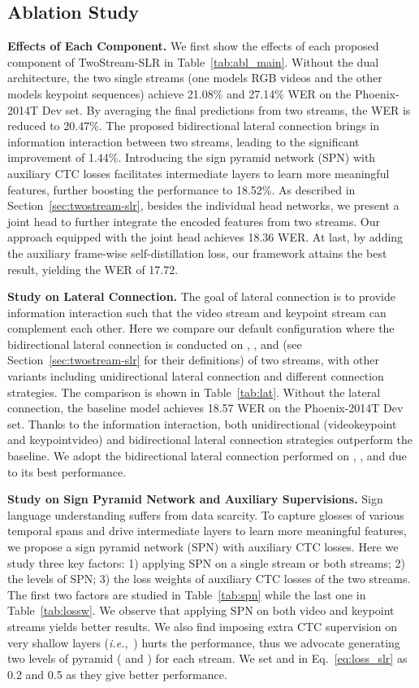 \documentclass{article}
\def\ie{\emph{i.e.}} \def\Ie{\emph{I.e.}}
\begin{document}
\subsection{Ablation Study}
\label{sec:ablation}
\textbf{Effects of Each Component.} We first show the effects of each proposed component of TwoStream-SLR in Table~\ref{tab:abl_main}. Without the dual architecture, the two single streams (one models RGB videos and the other models keypoint sequences) achieve 21.08\% and 27.14\% WER on the Phoenix-2014T Dev set. By averaging the final predictions from two streams, the WER is reduced to 20.47\%. The proposed bidirectional lateral connection brings in information interaction between two streams, leading to the significant improvement of 1.44\%. Introducing the sign pyramid network (SPN) with auxiliary CTC losses facilitates intermediate layers to learn more meaningful features, further boosting the performance to 18.52\%. As described in Section~\ref{sec:twostream-slr}, besides the individual head networks, we present a joint head to further integrate the encoded features from two streams. Our approach equipped with the joint head achieves 18.36 WER. At last, by adding the auxiliary frame-wise self-distillation loss, our framework attains the best result, yielding the WER of 17.72. 

\textbf{Study on Lateral Connection.} 
The goal of lateral connection is to provide information interaction such that the video stream and keypoint stream can complement each other. Here we compare our default configuration where the bidirectional lateral connection is conducted on , , and  (see Section~\ref{sec:twostream-slr} for their definitions) of two streams, with other variants including unidirectional lateral connection and different connection strategies. The comparison is shown in Table~\ref{tab:lat}. Without the lateral connection, the baseline model achieves 18.57 WER on the Phoenix-2014T Dev set. Thanks to the information interaction, both unidirectional (videokeypoint and keypointvideo) and bidirectional lateral connection strategies outperform the baseline. We adopt the bidirectional lateral connection performed on , , and  due to its best performance.


\textbf{Study on Sign Pyramid Network and Auxiliary Supervisions.}
Sign language understanding suffers from data scarcity. To capture glosses of various temporal spans and drive intermediate layers to learn more meaningful features, we propose a sign pyramid network (SPN) with auxiliary CTC losses. Here we study three key factors: 1) applying SPN on a single stream or both streams; 2) the levels of SPN; 3) the loss weights of auxiliary CTC losses of the two streams. The first two factors are studied in Table~\ref{tab:spn} while the last one in Table~\ref{tab:lossw}. We observe that applying SPN on both video and keypoint streams yields better results. We also find imposing extra CTC supervision on very shallow layers (\ie,~) hurts the performance, thus we advocate generating two levels of pyramid ( and ) for each stream. We set  and  in Eq.~\ref{eq:loss_slr} as 0.2 and 0.5 as they give better performance. 
\end{document}
